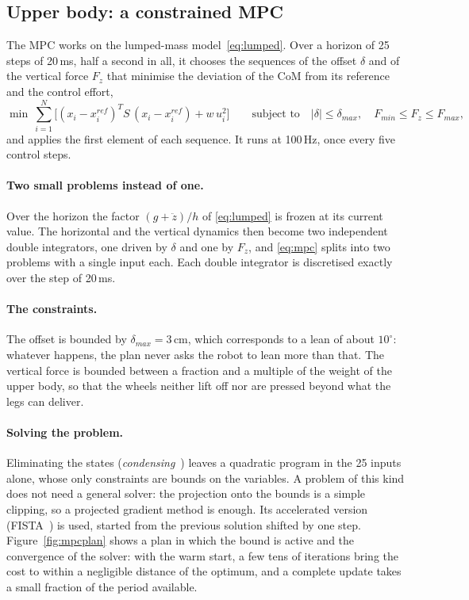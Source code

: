 \documentclass[11pt,a4paper]{article}
\begin{document}
\subsection{Upper body: a constrained MPC}

The MPC works on the lumped-mass model~\eqref{eq:lumped}. Over a horizon of 25 steps of 20\,ms, half a second in
all, it chooses the sequences of the offset $\delta$ and of the vertical force $F_z$ that minimise the deviation of
the CoM from its reference and the control effort,
\begin{equation}
  \min\ \sum_{i=1}^{N}\Big[(x_i-x_i^{ref})^{T}S\,(x_i-x_i^{ref})+w\,u_i^2\Big]
  \qquad\text{subject to}\quad |\delta|\le\delta_{max},\quad F_{min}\le F_z\le F_{max},
  \label{eq:mpc}
\end{equation}
and applies the first element of each sequence. It runs at 100\,Hz, once every five control steps.

\paragraph{Two small problems instead of one.} Over the horizon the factor $(g+\ddot z)/h$ of \eqref{eq:lumped} is
frozen at its current value. The horizontal and the vertical dynamics then become two independent double
integrators, one driven by $\delta$ and one by $F_z$, and \eqref{eq:mpc} splits into two problems with a single
input each. Each double integrator is discretised exactly over the step of 20\,ms.

\paragraph{The constraints.} The offset is bounded by $\delta_{max}=3$\,cm, which corresponds to a lean of about
$10^\circ$: whatever happens, the plan never asks the robot to lean more than that. The
vertical force is bounded between a fraction and a multiple of the weight of the upper body, so that the wheels
neither lift off nor are pressed beyond what the legs can deliver.

\paragraph{Solving the problem.} Eliminating the states (\emph{condensing}~\cite{jerez2011}) leaves a quadratic
program in the 25 inputs alone, whose only constraints are bounds on the variables. A problem of this kind does
not need a general solver: the projection onto the bounds is a simple clipping, so a projected gradient method is
enough. Its accelerated version (FISTA~\cite{beck2009}) is used, started from the previous solution
shifted by one step. Figure~\ref{fig:mpcplan} shows a plan in which the bound is active and the convergence of the
solver: with the warm start, a few tens of iterations bring the cost to within a negligible distance of the
optimum, and a complete update takes a small fraction of the period available.
\end{document}

